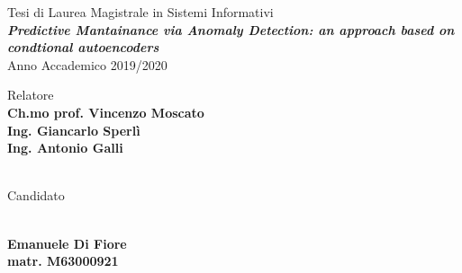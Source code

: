 \begin{titlepage}
\thispagestyle{empty}
\raggedright %


\vfill

{\large Tesi di Laurea Magistrale in Sistemi Informativi}
\\[1cm]
{\textbf{\textit{\LARGE Predictive Mantainance via Anomaly Detection: an approach based on condtional autoencoders}}}
\\[1cm]
{\large Anno Accademico 2019/2020}

\vfill


\begin{table}[h]
Relatore
\\
\textbf{Ch.mo prof. Vincenzo Moscato}
\\
\textbf{Ing. Giancarlo Sperlì}
\\
\textbf{Ing. Antonio Galli}
\\ \\
{\raggedright Candidato}
\\
\textbf{Emanuele Di Fiore}
\\
\textbf{matr. M63000921}
\end{table}

\end{titlepage}